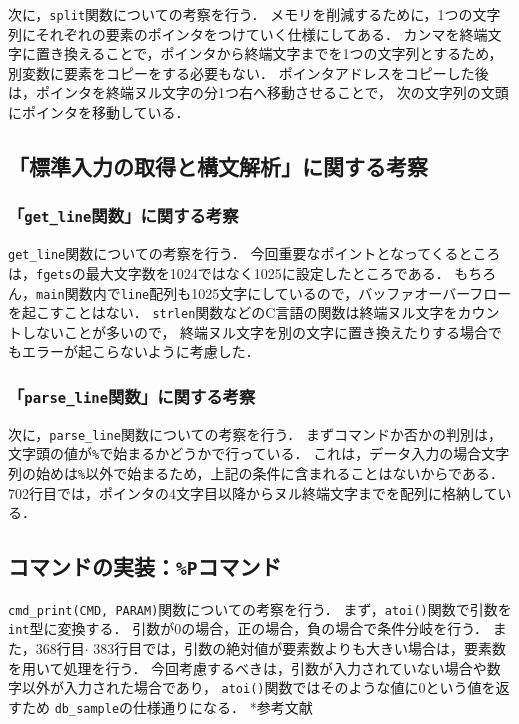 \documentclass[autodetect-engine,dvi=dvipdfmx,ja=standard,
               a4j,11pt]{bxjsarticle}
\begin{document}
次に，\verb|split|関数についての考察を行う．
メモリを削減するために，1つの文字列にそれぞれの要素のポインタをつけていく仕様にしてある．
カンマを終端文字に置き換えることで，ポインタから終端文字までを1つの文字列とするため，
別変数に要素をコピーをする必要もない．
ポインタアドレスをコピーした後は，ポインタを終端ヌル文字の分1つ右へ移動させることで，
次の文字列の文頭にポインタを移動している．

\subsection{「標準入力の取得と構文解析」に関する考察}

\subsubsection{「\texttt{get\_line}関数」に関する考察}

\verb|get_line|関数についての考察を行う．
今回重要なポイントとなってくるところは，\verb|fgets|の最大文字数を1024ではなく1025に設定したところである．
もちろん，\verb|main|関数内で\verb|line|配列も1025文字にしているので，バッファオーバーフローを起こすことはない．
\verb|strlen|関数などのC言語の関数は終端ヌル文字をカウントしないことが多いので，
終端ヌル文字を別の文字に置き換えたりする場合でもエラーが起こらないように考慮した．

\subsubsection{「\texttt{parse\_line}関数」に関する考察}

次に，\verb|parse_line|関数についての考察を行う．
まずコマンドか否かの判別は，文字頭の値が\verb|%|で始まるかどうかで行っている．
これは，データ入力の場合文字列の始めは\verb|%|以外で始まるため，上記の条件に含まれることはないからである．
702行目では，ポインタの4文字目以降からヌル終端文字までを配列に格納している．

\subsection{コマンドの実装：\texttt{\%P}コマンド}

\verb|cmd_print(CMD, PARAM)|関数についての考察を行う．
まず，\verb|atoi()|関数で引数を\verb|int|型に変換する．
引数が0の場合，正の場合，負の場合で条件分岐を行う．
また，368行目$\cdot$ 383行目では，引数の絶対値が要素数よりも大きい場合は，要素数を用いて処理を行う．
今回考慮するべきは，引数が入力されていない場合や数字以外が入力された場合であり，
\verb|atoi()|関数ではそのような値に$0$という値を返すため
\verb|db_sample|の仕様通りになる．
*参考文献\cite{web:atoi}
\end{document}
